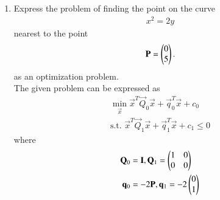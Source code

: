 \renewcommand{\theequation}{\theenumi}
\begin{enumerate}[label=\thesubsection.\arabic*.,ref=\thesubsection.\theenumi]

\item
	\label{prob:dist_pt_parab_sdp}
Express the problem of 
finding the point on the curve 
\begin{align}
\label{eq:dist_pt_parab_sdp}
x^2 = 2y
\end{align}
%
nearest to the point 
\begin{align}
\mathbf{P} = \begin{pmatrix}0\\5\end{pmatrix}.  
\end{align}
%
as an optimization problem.
\\
\solution The given problem can be expressed as
%
\begin{align}
\label{eq:qp_dist_pt_parab_sdp_qp}
\min_{\vec{x}}\vec{x}^T\vec{Q}_0\vec{x}+\vec{q}_0^T\vec{x}+c_0
\\
\text{s.t. }\vec{x}^T\vec{Q}_1\vec{x} + \vec{q}_1^T\vec{x} +c_1 \le 0
\end{align}
%
%
where
%
\begin{align}
\vec{Q}_0 &= \vec{I}, \vec{Q}_1 = \myvec{1 & 0\\0 & 0}
\\
\vec{q}_0 &=-2\vec{P}, \vec{q}_1 = -2\myvec{0 \\ 1}
\\

\end{align}
\end{enumerate}
